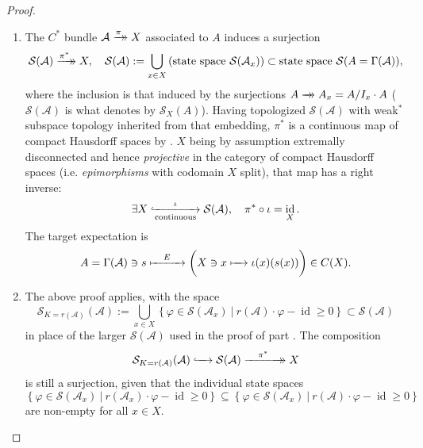 \documentclass[11pt,leqno]{article}
\theoremstyle{plain}
\theoremstyle{plain}
\theoremstyle{plain}
\numberwithin{equation}{section}
\theoremstyle{nonumberplain}
\newtheorem{proof}{Proof}
\newcommand\cA{{\mathcal A}}
\newcommand\cS{{\mathcal S}}
\newcommand\1{{\bf 1}}
\DeclareMathOperator{\id}{id}
\newcommand{\xrightarrowdbl}[2][]{%
  \xrightarrow[#1]{#2}\mathrel{\mkern-14mu}\rightarrow
}
\begin{document}
\begin{proof}
  \begin{enumerate}[(1),wide]
  \item The $C^*$ bundle $\cA\xrightarrowdbl{\pi}X$ associated to $A$ induces a surjection
    \begin{equation*}
      \cS(\cA)\xrightarrowdbl{\pi^*}X
      ,\quad
      \cS(\cA):=\bigcup_{x\in X}\left(\text{state space }\cS(\cA_x)\right)
      \subset \text{state space }\cS(A=\Gamma(\cA)),
    \end{equation*}
    where the inclusion is that induced by the surjections $A\xrightarrowdbl{}A_x=A/I_x\cdot A$ ($\cS(\cA)$ is what \cite[\S 3.1]{blnch} denotes by $\cS_X(A)$). Having topologized $\cS(\cA)$ with weak$^*$ subspace topology inherited from that embedding, $\pi^*$ is a continuous map of compact Hausdorff spaces by \cite[Proposition 15.4]{gierz_bdls}. $X$ being by assumption extremally disconnected and hence \cite[Theorem 2.5]{gls_proj-top-sp} {\it projective} in the category of compact Hausdorff spaces (i.e. \cite[\S V.4]{mcl_2e} {\it epimorphisms} with codomain $X$ split), that map has a right inverse:
    \begin{equation*}
      \exists
      X\lhook\joinrel\xrightarrow[\text{continuous}]{\quad\iota\quad}
      \cS(\cA)
      ,\quad
      \pi^*\circ\iota=\id_X. 
    \end{equation*}
    The target expectation is
    \begin{equation*}
      A=\Gamma(\cA)\ni s
      \xmapsto{\quad E\quad}
      \bigg(
      X\ni x
      \xmapsto{\quad}
      \iota(x)(s(x))
      \bigg)
      \in C(X).
    \end{equation*}
       
  \item The above proof applies, with the space
    \begin{equation}\label{eq:s.fixed.k}
      \cS_{K=r(\cA)}(\cA)
      :=
      \bigcup_{x\in X}
      \left\{\varphi\in \cS(\cA_x)\ |\ r(\cA)\cdot \varphi-\id\ge 0\right\}
      \subset \cS(\cA)
    \end{equation}
    in place of the larger $\cS(\cA)$ used in the proof of part . The composition
    \begin{equation*}
      \cS_{K=r(\cA)}(\cA)
      \lhook\joinrel\xrightarrow{\quad}
      \cS(\cA)
      \xrightarrowdbl{\quad\pi^*\quad}
      X
    \end{equation*}
    is still a surjection, given that \cite[Lemma 3.2]{bg_cx-exp} the individual state spaces
    \begin{equation*}
      \left\{\varphi\in \cS(\cA_x)\ |\ r(\cA_x)\cdot \varphi-\id\ge 0\right\}
      \subseteq
      \left\{\varphi\in \cS(\cA_x)\ |\ r(\cA)\cdot \varphi-\id\ge 0\right\}
    \end{equation*}
    are non-empty for all $x\in X$. 
  \end{enumerate}
\end{proof}
\end{document}
